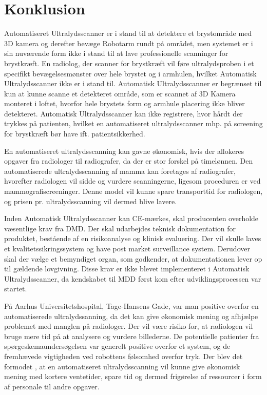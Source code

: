 \chapter{Konklusion}\label{kapitel_Konklusion}
Automatiseret Ultralydsscanner er i stand til at detektere et brystområde med 3D kamera og derefter bevæge Robotarm rundt på området, men systemet er i sin nuværende form ikke i stand til at lave professionelle scanninger for brystkræft. En radiolog, der scanner for brystkræft vil føre ultralydsproben i et specifikt bevægelsesmønster over hele brystet og i armhulen, hvilket Automatisk Ultralydsscanner ikke er i stand til. Automatisk Ultralydsscanner er begrænset til kun at kunne scanne et detekteret område, som er scannet af 3D Kamera monteret i loftet, hvorfor hele brystets form og armhule placering ikke bliver detekteret. Automatisk Ultralydsscanner kan ikke registrere, hvor hårdt der trykkes på patienten, hvilket en automatiseret ultralydsscanner mhp. på screening for brystkræft bør have ift. patientsikkerhed. 

En automatiseret ultralydsscanning kan gavne økonomisk, hvis der allokeres opgaver fra radiologer til radiografer, da der er stor forskel på timelønnen. Den automatiserede ultralydsscanning af mamma kan foretages af radiografer, hvorefter radiologen vil sidde og vurdere scanningerne, ligesom proceduren er ved mammografiscreeninger. Denne model vil kunne spare transporttid for radiologen, og prisen pr. ultralydsscanning vil dermed blive lavere.  

Inden Automatisk Ultralydsscanner kan CE-mærkes, skal producenten overholde væsentlige krav fra DMD. Der skal udarbejdes teknisk dokumentation for produktet, bestående af en risikoanalyse og klinisk evaluering. Der vil skulle laves et kvalitetssikringssystem og have post market surveillance system. Derudover skal der vælge et bemyndiget organ, som godkender, at dokumentationen lever op til gældende lovgivning. Disse krav er ikke blevet implementeret i Automatisk Ultralydsscanner, da kendskabet til MDD først kom efter udviklingsprocessen var startet.

På Aarhus Universitetshospital, Tage-Hansens Gade, var man positive overfor en automatiserede ultralydssanning, da det kan give økonomisk mening og afhjælpe problemet med manglen på radiologer. Der vil være risiko for, at radiologen vil bruge mere tid på at analysere og vurdere billederne. 
De potentielle patienter fra spørgeskemaundersøgelsen var generelt positive overfor et system, og de fremhævede vigtigheden ved robottens følsomhed overfor tryk. Der blev det formodet , at en automatiseret ultralydsscanning vil kunne give økonomisk mening med kortere ventetider, spare tid og dermed frigørelse af ressourcer i form af personale til andre opgaver. 
